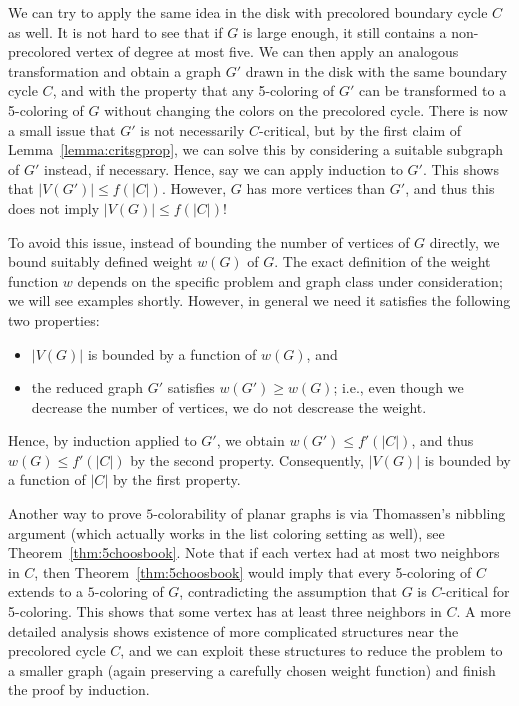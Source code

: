 \documentclass[12pt,twoside,openright,a4paper]{book}
\begin{document}
We can try to apply the same idea in the disk with precolored boundary cycle $C$ as well.  It is not hard to see that if $G$
is large enough, it still contains a non-precolored vertex of degree at most five.  We can then apply an analogous transformation
and obtain a graph $G'$ drawn in the disk with the same boundary cycle $C$, and with the property that any 5-coloring of $G'$
can be transformed to a 5-coloring of $G$ without changing the colors on the precolored cycle.  There is now a small issue
that $G'$ is not necessarily $C$-critical, but by the first claim of Lemma~\ref{lemma:critsgprop}, we can solve this
by considering a suitable subgraph of $G'$ instead, if necessary.  Hence, say we can apply induction to $G'$.
This shows that $|V(G')|\le f(|C|)$.  However, $G$ has more vertices than $G'$, and thus this does not imply $|V(G)|\le f(|C|)$!

To avoid this issue, instead of bounding the number of vertices of $G$ directly, we bound suitably defined weight $w(G)$
of $G$.  The exact definition of the weight function $w$ depends on the specific problem and graph class under consideration;
we will see examples shortly.  However, in general we need it satisfies the following two properties:
\begin{itemize}
\item $|V(G)|$ is bounded by a function of $w(G)$, and
\item the reduced graph $G'$ satisfies $w(G')\ge w(G)$; i.e., even though we decrease the number of vertices,
we do not descrease the weight.
\end{itemize}
Hence, by induction applied to $G'$, we obtain $w(G')\le f'(|C|)$, and thus $w(G)\le f'(|C|)$ by the second property.
Consequently, $|V(G)|$ is bounded by a function of $|C|$ by the first property.

Another way to prove $5$-colorability of planar graphs is via Thomassen's nibbling argument (which actually works
in the list coloring setting as well), see Theorem~\ref{thm:5choosbook}.  Note that if each vertex 
had at most two neighbors in $C$, then Theorem~\ref{thm:5choosbook} would imply that every 5-coloring of $C$ extends to a $5$-coloring
of $G$, contradicting the assumption that $G$ is $C$-critical for 5-coloring.  This shows that some vertex has at least three
neighbors in $C$.  A more detailed analysis shows existence of more complicated structures near the precolored cycle $C$,
and we can exploit these structures to reduce the problem to a smaller graph (again preserving a carefully chosen weight function)
and finish the proof by induction.
\end{document}
